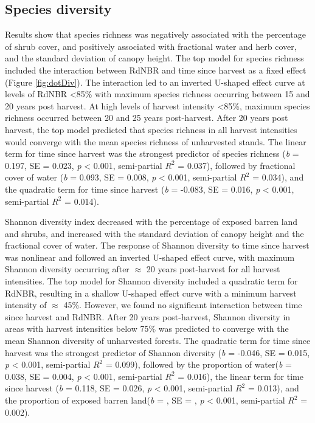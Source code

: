 \documentclass[
  12pt,
]{article}
\begin{document}
\hypertarget{species-diversity}{%
\subsection{Species diversity}\label{species-diversity}}

Results show that species richness was negatively associated with the percentage of shrub cover, and positively associated with fractional water and herb cover, and the standard deviation of canopy height. The top model for species richness included the interaction between RdNBR and time since harvest as a fixed effect (Figure \ref{fig:dotDiv}). The interaction led to an inverted U-shaped effect curve at levels of RdNBR \textless85\% with maximum species richness occurring between 15 and 20 years post harvest. At high levels of harvest intensity \textless85\%, maximum species richness occurred between 20 and 25 years post-harvest. After 20 years post harvest, the top model predicted that species richness in all harvest intensities would converge with the mean species richness of unharvested stands. The linear term for time since harvest was the strongest predictor of species richness (\emph{b} = 0.197, SE = 0.023, \emph{p} \textless{} 0.001, semi-partial \(R^2\) = 0.037), followed by fractional cover of water (\emph{b} = 0.093, SE = 0.008, \emph{p} \textless{} 0.001, semi-partial \(R^2\) = 0.034), and the quadratic term for time since harvest (\emph{b} = -0.083, SE = 0.016, \emph{p} \textless{} 0.001, semi-partial \(R^2\) = 0.014).

Shannon diversity index decreased with the percentage of exposed barren land and shrubs, and increased with the standard deviation of canopy height and the fractional cover of water. The response of Shannon diversity to time since harvest was nonlinear and followed an inverted U-shaped effect curve, with maximum Shannon diversity occurring after \(\approx\) 20 years post-harvest for all harvest intensities. The top model for Shannon diversity included a quadratic term for RdNBR, resulting in a shallow U-shaped effect curve with a minimum harvest intensity of \(\approx\) 45\%. However, we found no significant interaction between time since harvest and RdNBR. After 20 years post-harvest, Shannon diversity in areas with harvest intensities below 75\% was predicted to converge with the mean Shannon diversity of unharvested forests. The quadratic term for time since harvest was the strongest predictor of Shannon diversity (\emph{b} = -0.046, SE = 0.015, \emph{p} \textless{} 0.001, semi-partial \(R^2\) = 0.099), followed by the proportion of water(\emph{b} = 0.038, SE = 0.004, \emph{p} \textless{} 0.001, semi-partial \(R^2\) = 0.016), the linear term for time since harvest (\emph{b} = 0.118, SE = 0.026, \emph{p} \textless{} 0.001, semi-partial \(R^2\) = 0.013), and the proportion of exposed barren land(\emph{b} = , SE = , \emph{p} \textless{} 0.001, semi-partial \(R^2\) = 0.002).
\end{document}
